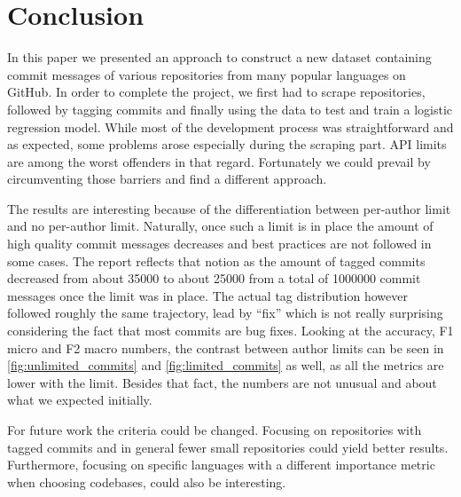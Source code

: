 \section{Conclusion}
\label{sec:conclusion}

In this paper we presented an approach to construct a new dataset containing
commit messages of various repositories from many popular languages on GitHub.
In order to complete the project, we first had to scrape repositories, followed
by tagging commits and finally using the data to test and train a logistic
regression model. While most of the development process was straightforward and
as expected, some problems arose especially during the scraping part. API limits
are among the worst offenders in that regard. Fortunately we could prevail by
circumventing those barriers and find a different approach.

The results are interesting because of the differentiation between per-author
limit and no per-author limit. Naturally, once such a limit is in place the
amount of high quality commit messages decreases and best practices are not
followed in some cases. The report reflects that notion as the amount of
tagged commits decreased from about 35000 to about 25000 from a total of
1000000 commit messages once the limit was in place. The actual tag distribution
however followed roughly the same trajectory, lead by “fix” which is
not really surprising considering the fact that most commits are bug fixes.
Looking at the accuracy, F1 micro and F2 macro numbers, the contrast between
author limits can be seen in \autoref{fig:unlimited_commits} and \autoref{fig:limited_commits}
as well, as all the metrics are lower with the limit. Besides that fact, the
numbers are not unusual and about what we expected initially.

For future work the criteria could be changed. Focusing on repositories with
tagged commits and in general fewer small repositories could yield better
results. Furthermore, focusing on specific languages with a different
importance metric when choosing codebases, could also be interesting.
